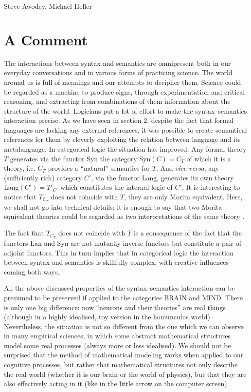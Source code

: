 \begin{artengenv2auth}{Steve Awodey, Michael Heller}
\section{A Comment}
The interactions between syntax and semantics are omnipresent both in our everyday conversations and in various forms of practicing science. The world around us is full of meanings and our attempts to decipher them. Science could be regarded as a machine to produce signs, through experimentation and critical reasoning, and  extracting from combinations of them information about the structure of the world. Logicians put a lot of effort to make the syntax--semantics interaction precise. As we have seen in section 2, despite the fact that formal languages are lacking any external references, it was possible to create semantical references for them  by cleverly exploiting the relation between language and its metalanguage. In categorical logic the situation has improved. Any formal theory $T$ generates via the functor Syn the category $\mathrm{Syn}(C)=C_T$ of which it is a theory, i.e. $C_T$ provides a ``natural'' semantics for $T$. And \textit{vice versa}, any (sufficiently rich) category $C'$, via the functor Lang, generates its own theory Lang$(C')=T'_{C'}$ which constitutes the internal logic of $C'$. It is interesting to notice that  $T_{C_T}$ does not coincide with $T$, they are only Morita equivalent. Here, we shall not go into technical details; it is enough to say that two Morita equivalent theories could be regarded as two interpretations of the same theory \parencite{Halvorson2016}.

The fact that $T_{C_T}$ does not coincide with $T$ is a consequence of the fact that the functors Lan and Syn are not mutually inverse functors but constitute a pair of adjoint functors. This in turn implies that in categorical logic the interaction between syntax and semantics is skillfully complex, with creative influences coming both ways.

All the above discussed properties of the syntax--semantics interaction can be presumed to be preserved if applied to the categories BRAIN and MIND. There is only one big difference: now ``neurons and their theories'' are real things (although in a highly idealised, toy version in the homunculus world). Nevertheless, the situation is not so different from the one which we can observe in many empirical sciences, in which some abstract mathematical structures model some real processes (always more or less idealised). We should not be surprised that the method of mathematical modeling  works when applied to our cognitive processes, but rather that mathematical structures not only describe the real world (whether it is our brain or the world of physics), but that they are also effectively acting in it (like in the little arrow on the computer screen). 
 
 
 \end{artengenv2auth}

